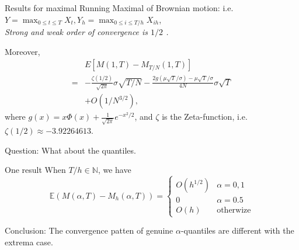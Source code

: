 \documentclass[cjk]{beamer}
\begin{document}
\begin{frame}{Results for maximal}
Running Maximal of Brownian motion: 
i.e. 
$\displaystyle Y = \max_{0\leq t\leq T} X_t, Y_h = \max_{0\leq i\leq T/h} X_{ih}$,\\
\em Strong and weak order of convergence is $1/2$ \cite{A-G-P-1995}. 

Moreover\cite{Janssen2008}, 
\[
\begin{split}
 & E[M(1,T)-M_{T/N}(1,T)]\\
=& -\frac{\zeta(1/2)}{\sqrt{2\pi}}\sigma\sqrt{T/N} 
 -\frac{2g(\mu\sqrt{T}/\sigma)-\mu\sqrt{T}/ \sigma}{4N}\sigma\sqrt{T} \\
 &+O(1/N^{3/2}),
\end{split}
\]
where
$g(x)=x \Phi(x) + \frac{1}{\sqrt{2\pi}} e^{-{x^2 /2 }}$,
and $\zeta$ is the Zeta-function, i.e. 
$
\zeta(1/2) \approx -3.92264613.
$

{\color{red} Question:} What about the quantiles.
\end{frame}

\begin{frame}{One result}
When $T/h \in \mathbb{N}$, we have 
\[
\mathbb{E}\left( M(\alpha, T) - M_h(\alpha,T)\right) 
= 
\begin{cases}
O(h^{1/2}) & \alpha=0,1\\
0 & \alpha=0.5\\
O(h) & \text{otherwize}
\end{cases} 
\]

Conclusion: The convergence patten of genuine $\alpha$-quantiles are different
with the extrema case. 
\end{frame}
\end{document}
